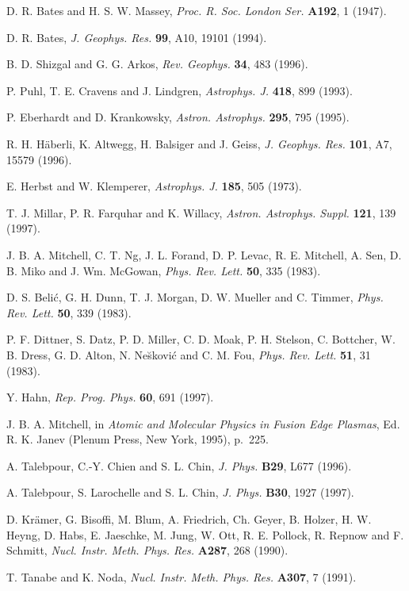 \documentclass{ws-rv9x6}
\begin{document}
\begin{thebibliography}{000}
D. R. Bates and H. S. W. Massey, {\it Proc. R. Soc. London Ser.} {\bf
A192}, 1 (1947).

D. R. Bates, {\it J. Geophys. Res.} {\bf 99}, A10, 19101 (1994).

B. D. Shizgal and G. G. Arkos, {\it Rev. Geophys.} {\bf 34}, 483
(1996).

P. Puhl, T. E. Cravens and J. Lindgren, {\it Astrophys. J.} {\bf 418},
899 (1993).

P. Eberhardt and D. Krankowsky, {\it Astron. Astrophys.} {\bf 295},
795 (1995).

R. H. H\"aberli, K. Altwegg, H. Balsiger and J. Geiss, {\it
J. Geophys. Res.} {\bf 101}, A7, 15579 (1996).

E. Herbst and W. Klemperer, {\it Astrophys. J.} {\bf 185}, 505 (1973).

T. J. Millar, P. R. Farquhar and K. Willacy, {\it
Astron. Astrophys. Suppl.} {\bf 121}, 139 (1997).

J. B. A. Mitchell, C. T. Ng, J. L. Forand, D. P.  Levac,
R. E. Mitchell, A. Sen, D. B. Miko and J. Wm. McGowan, {\it Phys. Rev. Lett.} {\bf
50}, 335 (1983).

D. S. Beli\'c, G. H. Dunn, T. J. Morgan, D. W. Mueller and C. Timmer,
{\it Phys. Rev. Lett.} {\bf 50}, 339 (1983).

P. F. Dittner, S. Datz, P. D. Miller, C. D. Moak, P. H. Stelson,
C. Bottcher, W. B. Dress, G. D. Alton, N. Ne\u skovi\'c and C. M. Fou,
{\it Phys. Rev. Lett.} {\bf 51}, 31 (1983).

Y. Hahn, {\it Rep. Prog. Phys.} {\bf 60}, 691 (1997).

J. B. A. Mitchell, in {\it Atomic and Molecular Physics in Fusion Edge
Plasmas}, Ed. R. K. Janev (Plenum Press, New York, 1995), p.~225.

A. Talebpour, C.-Y. Chien and S. L. Chin, {\it J. Phys.} {\bf B29},
L677 (1996).

A. Talebpour, S. Larochelle and S. L. Chin, {\it J. Phys.} {\bf B30},
1927 (1997).

D. Kr\"amer, G. Bisoffi, M. Blum, A. Friedrich, Ch. Geyer, B. Holzer,
H. W. Heyng, D. Habs, E. Jaeschke, M. Jung, W. Ott, R. E. Pollock,
R. Repnow and F. Schmitt, {\it Nucl.  Instr. Meth. Phys. Res.} {\bf
A287}, 268 (1990).

T. Tanabe and K. Noda, {\it Nucl. Instr. Meth. Phys. Res.} {\bf A307}, 7
(1991).


\end{thebibliography}
\end{document}
